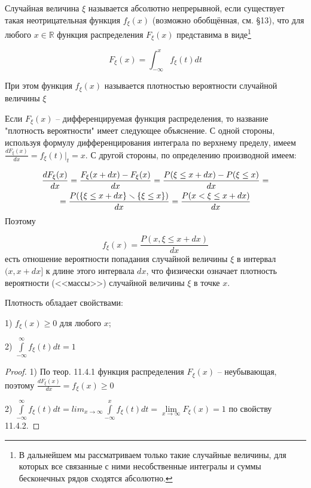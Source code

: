 \begin{definition}
	Случайная величина $\xi$ называется абсолютно непрерывной, если существует такая неотрицательная функция $f_{\xi} (x)$ (возможно обобщённая, см. §13), что для любого $x \in \mathbb{R}$ функция распределения $F_{\xi}(x)$ представима в виде\footnote{В дальнейшем мы рассматриваем только такие случайные величины, для которых все связанные с
ними несобственные интегралы и суммы бесконечных рядов сходятся абсолютно.
	}
  
  \begin{equation*}
 F_{\xi}(x)=\int_{-\infty}^{x} f_{\xi}(t) dt  	
  \end{equation*}

При этом функция $f_{\xi}(x)$ называется плотностью вероятности случайной величины $\xi$
\end{definition}

\begin{zam}
Если $F_{\xi}(x)$ -- дифференцируемая функция распределения, то название "плотность вероятности" имеет следующее объяснение. С одной стороны, используя формулу дифференцирования интеграла по верхнему пределу, имеем $\frac{dF_{\xi}(x)}{dx}=f_{\xi}(t)|_t=x$. С другой стороны, по определению производной имеем:

\begin{gather*}
	\frac{dF_{\xi}(x)}{dx} = \frac{F_{\xi}(x+dx)-F_{\xi}(x)}{dx}=\frac{P(\xi \leq x+dx)-P(\xi \leq x)}{dx}=\\=\frac{P(\{\xi \leq x+dx \}\smallsetminus \{\xi \leq x\})}{dx} = \frac{P(x<\xi \leq x+dx)}{dx}
\end{gather*}
Поэтому

\begin{equation*}
	f_{\xi}(x)=\frac{P(x,\xi \leq x+dx)}{dx}	
\end{equation*}
есть отношение вероятности попадания случайной величины $\xi$ в интервал $(x, x+dx]$ к длине этого интервала $dx$, что физически означает плотность вероятности (<<массы>>) случайной величины $\xi$ в точке $x$.
\end{zam}
 

 \begin{theorem}
Плотность обладает свойствами:

1) $f_{\xi}(x) \geq 0$ для любого $x$;

2) $\int\limits_{-\infty}^{\infty} f_{\xi}(t)dt=1$
 \end{theorem}

\begin{proof}

1) По теор. 11.4.1 функция распределения $F_{\xi}(x)$ -- неубывающая, поэтому $\frac{dF_{\xi}(x)}{dx}=f_{\xi}(x) \geq 0$

2) $\int\limits_{-\infty}^{\infty}f_{\xi}(t)dt = lim_{x \to \infty}\int\limits_{-\infty}^{x}f_{\xi}(t)dt = \lim\limits_{x \to \infty}F_{\xi}(x) = 1$ по свойству 11.4.2.
\end{proof} 


